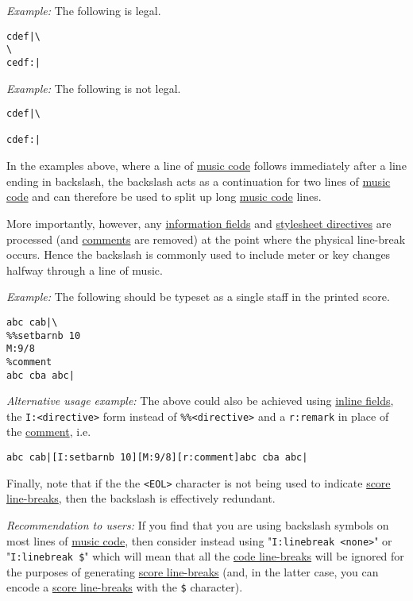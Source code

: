 \emph{Example:} The following is legal.

\begin{verbatim}
cdef|\
\
cedf:|
\end{verbatim}

\emph{Example:} The following is not legal.

\begin{verbatim}
cdef|\

cdef:|
\end{verbatim}

In the examples above, where a line of
\protect\hyperlink{music_code_definition}{music code} follows
immediately after a line ending in backslash, the backslash acts as a
continuation for two lines of
\protect\hyperlink{music_code_definition}{music code} and can therefore
be used to split up long \protect\hyperlink{music_code_definition}{music
code} lines.

More importantly, however, any
\protect\hyperlink{information_field_definition}{information fields} and
\protect\hyperlink{stylesheet_directive_definition}{stylesheet
directives} are processed (and
\protect\hyperlink{comment_definition}{comments} are removed) at the
point where the physical line-break occurs. Hence the backslash is
commonly used to include meter or key changes halfway through a line of
music.

\emph{Example:} The following should be typeset as a single staff in the
printed score.

\begin{verbatim}
abc cab|\
%%setbarnb 10
M:9/8
%comment
abc cba abc|
\end{verbatim}

\emph{Alternative usage example:} The above could also be achieved using
\protect\hyperlink{inline_field_definition}{inline fields}, the
\texttt{I:\textless{}directive\textgreater{}} form instead of
\texttt{\%\%\textless{}directive\textgreater{}} and a \texttt{r:remark}
in place of the \protect\hyperlink{comment_definition}{comment}, i.e.

\begin{verbatim}
abc cab|[I:setbarnb 10][M:9/8][r:comment]abc cba abc|
\end{verbatim}

Finally, note that if the the \texttt{\textless{}EOL\textgreater{}}
character is not being used to indicate
\protect\hyperlink{score_line-break_definition}{score line-breaks}, then
the backslash is effectively redundant.

\emph{Recommendation to users:} If you find that you are using backslash
symbols on most lines of \protect\hyperlink{music_code_definition}{music
code}, then consider instead using
"\texttt{I:linebreak\ \textless{}none\textgreater{}}" or
"\texttt{I:linebreak\ \$}" which will mean that all the
\protect\hyperlink{code_line-break_definition}{code line-breaks} will be
ignored for the purposes of generating
\protect\hyperlink{score_line-break_definition}{score line-breaks} (and,
in the latter case, you can encode a
\protect\hyperlink{score_line-break_definition}{score line-breaks} with
the \texttt{\$} character).

